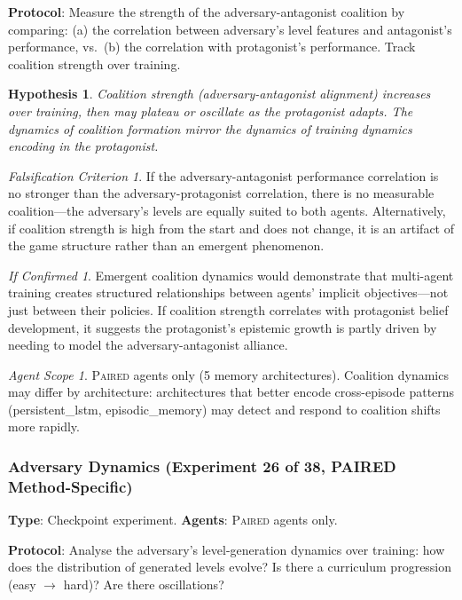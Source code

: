 \documentclass[11pt,a4paper]{article}
\newtheorem{hypothesis}{Hypothesis}[subsection]
\theoremstyle{remark}
\newtheorem*{falsification}{Falsification Criterion}
\newtheorem*{implication}{If Confirmed}
\newtheorem*{agentscope}{Agent Scope}
\newcommand{\paired}{\textsc{Paired}}
\begin{document}
\textbf{Protocol}: Measure the strength of the adversary-antagonist coalition by comparing: (a) the correlation between adversary's level features and antagonist's performance, vs.\ (b) the correlation with protagonist's performance. Track coalition strength over training.

\begin{hypothesis}
Coalition strength (adversary-antagonist alignment) increases over training, then may plateau or oscillate as the protagonist adapts. The dynamics of coalition formation mirror the dynamics of training dynamics encoding in the protagonist.
\end{hypothesis}

\begin{falsification}
If the adversary-antagonist performance correlation is no stronger than the adversary-protagonist correlation, there is no measurable coalition---the adversary's levels are equally suited to both agents. Alternatively, if coalition strength is high from the start and does not change, it is an artifact of the game structure rather than an emergent phenomenon.
\end{falsification}

\begin{implication}
Emergent coalition dynamics would demonstrate that multi-agent training creates structured relationships between agents' implicit objectives---not just between their policies. If coalition strength correlates with protagonist belief development, it suggests the protagonist's epistemic growth is partly driven by needing to model the adversary-antagonist alliance.
\end{implication}

\begin{agentscope}
\paired{} agents only (5 memory architectures). Coalition dynamics may differ by architecture: architectures that better encode cross-episode patterns (persistent\_lstm, episodic\_memory) may detect and respond to coalition shifts more rapidly.
\end{agentscope}

\subsubsection{Adversary Dynamics (Experiment 26 of 38, PAIRED Method-Specific)}
\label{exp:adversary_dynamics}

\textbf{Type}: Checkpoint experiment. \textbf{Agents}: \paired{} agents only.

\textbf{Protocol}: Analyse the adversary's level-generation dynamics over training: how does the distribution of generated levels evolve? Is there a curriculum progression (easy $\to$ hard)? Are there oscillations?
\end{document}
